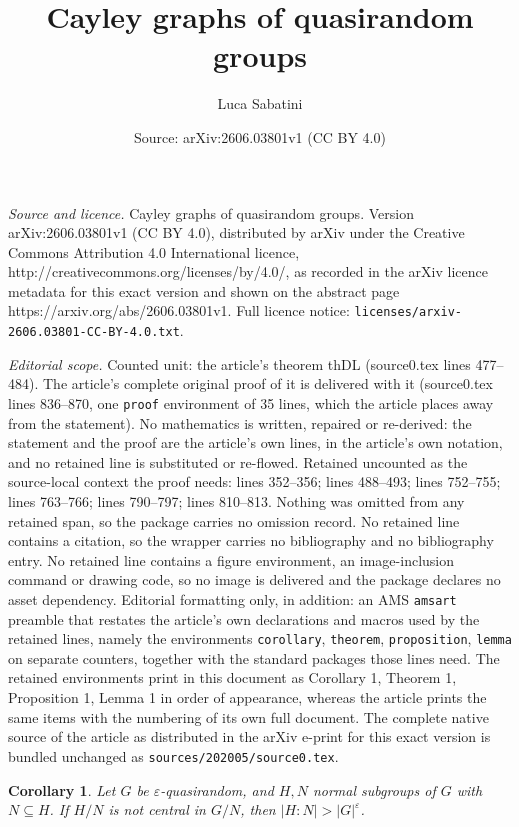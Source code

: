 \documentclass[10pt,a4paper]{amsart}
\title{Cayley graphs of quasirandom groups}
\author{Luca Sabatini}
\date{Source: arXiv:2606.03801v1 (CC BY 4.0)}
\newtheorem{corollary}{Corollary}
\begin{document}
\maketitle

\noindent\emph{Source and licence.} Cayley graphs of quasirandom groups. Version arXiv:2606.03801v1 (CC BY 4.0), distributed by arXiv under the Creative Commons Attribution 4.0 International licence, http://creativecommons.org/licenses/by/4.0/, as recorded in the arXiv licence metadata for this exact version and shown on the abstract page https://arxiv.org/abs/2606.03801v1. Full licence notice: \texttt{licenses/arxiv-2606.03801-CC-BY-4.0.txt}.\par\smallskip

\noindent\textit{Editorial scope.} Counted unit: the article's theorem thDL (source0.tex lines 477--484). The article's complete original proof of it is delivered with it (source0.tex lines 836--870, one \texttt{proof} environment of 35 lines, which the article places away from the statement). No mathematics is written, repaired or re-derived: the statement and the proof are the article's own lines, in the article's own notation, and no retained line is substituted or re-flowed.  Retained uncounted as the source-local context the proof needs: lines 352--356; lines 488--493; lines 752--755; lines 763--766; lines 790--797; lines 810--813.  Nothing was omitted from any retained span, so the package carries no omission record.  No retained line contains a citation, so the wrapper carries no bibliography and no bibliography entry.  No retained line contains a figure environment, an image-inclusion command or drawing code, so no image is delivered and the package declares no asset dependency.  Editorial formatting only, in addition: an AMS \texttt{amsart} preamble that restates the article's own declarations and macros used by the retained lines, namely the environments \texttt{corollary}, \texttt{theorem}, \texttt{proposition}, \texttt{lemma} on separate counters, together with the standard packages those lines need.  The retained environments print in this document as Corollary 1, Theorem 1, Proposition 1, Lemma 1 in order of appearance, whereas the article prints the same items with the numbering of its own full document.  The complete native source of the article as distributed in the arXiv e-print for this exact version is bundled unchanged as \texttt{sources/202005/source0.tex}.
\begin{corollary} \label{corQChief}
Let $G$ be $\varepsilon$-quasirandom, and $H,N$ normal subgroups of $G$ with $N \subseteq H$.
If $H/N$ is not central in $G/N$,
then $|H:N| > |G|^\varepsilon$.
\end{corollary}
\end{document}
